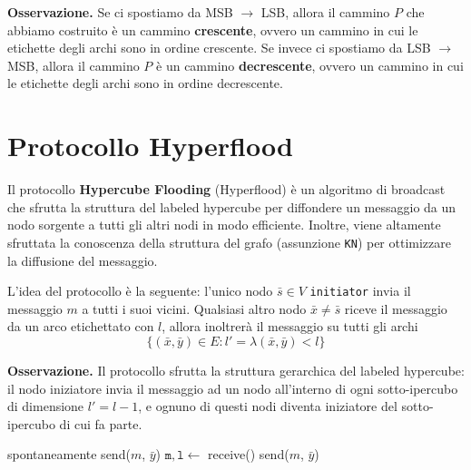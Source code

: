 \textbf{Osservazione.} Se ci spostiamo da MSB $\to$ LSB, allora il cammino $P$ che abbiamo costruito è un cammino \textbf{crescente}, ovvero un cammino in cui le etichette degli archi sono in ordine crescente. Se invece ci spostiamo da LSB $\to$ MSB, allora il cammino $P$ è un cammino \textbf{decrescente}, ovvero un cammino in cui le etichette degli archi sono in ordine decrescente.

\section{Protocollo Hyperflood}

Il protocollo \textbf{Hypercube Flooding} (Hyperflood) è un algoritmo di broadcast che sfrutta la struttura del labeled hypercube per diffondere un messaggio da un nodo sorgente a tutti gli altri nodi in modo efficiente. Inoltre, viene altamente sfruttata la conoscenza della struttura del grafo (assunzione \texttt{KN}) per ottimizzare la diffusione del messaggio.

L'idea del protocollo è la seguente: l'unico nodo $\bar{s} \in V$ \texttt{initiator} invia il messaggio $m$ a tutti i suoi vicini. Qualsiasi altro nodo $\bar{x} \neq \bar{s}$ riceve il messaggio da un arco etichettato con $l$, allora inoltrerà il messaggio su tutti gli archi 
\[
    \{(\bar{x}, \bar{y}) \in E : l' = \lambda(\bar{x}, \bar{y}) < l\}
\]

\textbf{Osservazione.} Il protocollo sfrutta la struttura gerarchica del labeled hypercube: il nodo iniziatore invia il messaggio ad un nodo all'interno di ogni sotto-ipercubo di dimensione $l' = l - 1$, e ognuno di questi nodi diventa iniziatore del sotto-ipercubo di cui fa parte.

\begin{algorithm}[H]
\caption{Hyperflood}
    \begin{algorithmic}
     spontaneamente
            \State send($m$, $\bar{y}$)
        \EndFor
    \Else
        \State $\texttt{m}, \texttt{l} \gets$ receive()
                \State send($m$, $\bar{y}$)
            \EndIf
        \EndFor
    \EndIf
    \end{algorithmic}
\end{algorithm}

